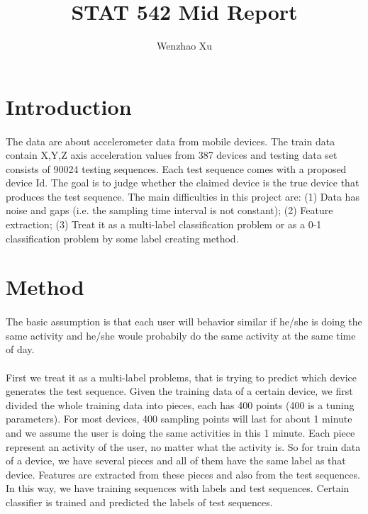 \documentclass{article}
\author{Wenzhao Xu}
\title{STAT 542 Mid Report}
\begin{document}
	\maketitle
	
	\section{Introduction} %
	\label{sec:introduction}
	\paragraph{} The data are about accelerometer data from mobile devices. The train data contain X,Y,Z axis acceleration values from 387 devices and testing data set consists of 90024 testing sequences. Each test sequence comes with a proposed device Id. The goal is to judge whether the claimed device is the true device that produces the test sequence. The main difficulties in this project are: (1) Data has noise and gaps (i.e. the sampling time interval is not constant); (2) Feature extraction; (3) Treat it as a multi-label classification problem or as a 0-1 classification problem by some label creating method. 
	
	
	\section{Method} %
	\label{sec:method}
	\paragraph{} The basic assumption is that each user will behavior similar if he/she is doing the same activity and he/she woule probabily do the same activity at the same time of day. 
	\paragraph{}First we treat it as a multi-label problems, that is trying to predict which device generates the test sequence. Given the training data of a certain device, we first divided the whole training data into pieces, each has 400 points (400 is a tuning parameters). For most devices, 400 sampling points will last for about 1 minute and we assume the user is doing the same activities in this 1 minute. Each piece represent an activity of the user, no matter what the activity is. So for train data of a device, we have several pieces and all of them have the same label as that device. Features are extracted from these pieces and also from the test sequences. In this way, we have training sequences with labels and test sequences. Certain classifier is trained and predicted the labels of test sequences.
\end{document}
